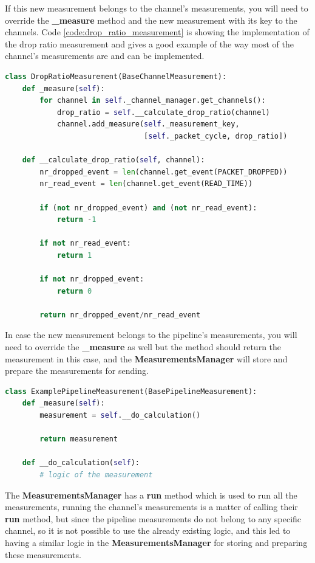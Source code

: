 If this new measurement belongs to the channel's measurements, you will need to override the \textbf{\_measure}
method and the new measurement with its key to the channels. Code \ref{code:drop_ratio_measurement} is showing
the implementation of the drop ratio measurement and gives a good example of the way most of the channel's measurements
are and can be implemented.
\newline
\begin{lstlisting}[language=Python, label={code:drop_ratio_measurement}, caption={Drop ratio measurement},captionpos=b]
class DropRatioMeasurement(BaseChannelMeasurement):
    def _measure(self):
        for channel in self._channel_manager.get_channels():
            drop_ratio = self.__calculate_drop_ratio(channel)
            channel.add_measure(self._measurement_key, 
                                [self._packet_cycle, drop_ratio])

    def __calculate_drop_ratio(self, channel):
        nr_dropped_event = len(channel.get_event(PACKET_DROPPED))
        nr_read_event = len(channel.get_event(READ_TIME))

        if (not nr_dropped_event) and (not nr_read_event):
            return -1

        if not nr_read_event:
            return 1

        if not nr_dropped_event:
            return 0

        return nr_dropped_event/nr_read_event
\end{lstlisting}

In case the new measurement belongs to the pipeline's measurements, you will need to override the \textbf{\_measure}
as well but the method should return the measurement in this case, and the \textbf{MeasurementsManager} will
store and prepare the measurements for sending.
\newline
\begin{lstlisting}[language=Python, caption={Pipeline's measurement example},captionpos=b]
class ExamplePipelineMeasurement(BasePipelineMeasurement):
	def _measure(self):
		measurement = self.__do_calculation()

		return measurement

	def __do_calculation(self):
		# logic of the measurement
\end{lstlisting}

The \textbf{MeasurementsManager} has a \textbf{run} method which is used to run all the measurements, 
running the channel's measurements is a matter of calling their \textbf{run} method, but since the pipeline measurements do not belong to any specific channel, so it is not possible to use the already
existing logic, and this led to having a similar logic in the \textbf{MeasurementsManager} for
storing and preparing these measurements.


